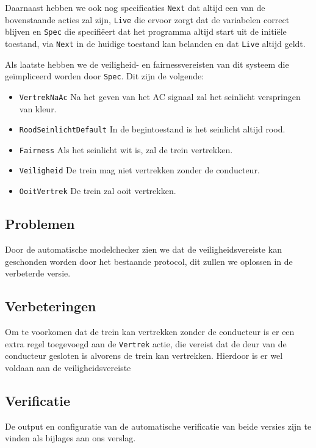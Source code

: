 \documentclass[a4paper,10pt]{article}
\begin{document}
Daarnaast hebben we ook nog specificaties \texttt{Next} dat altijd een van de
bovenstaande acties zal zijn, \texttt{Live} die ervoor zorgt dat de
variabelen correct blijven en \texttt{Spec} die specifi\"eert dat het programma
altijd start uit de initi\"ele toestand, via \texttt{Next} in de huidige toestand
kan belanden en dat \texttt{Live} altijd geldt.

Als laatste hebben we de veiligheid- en fairnessvereisten van dit systeem die
ge\"impliceerd worden door \texttt{Spec}. Dit zijn de volgende:

\begin{itemize}
    \item \texttt{VertrekNaAc} Na het geven van het AC signaal zal het seinlicht
    verspringen van kleur.
    \item \texttt{RoodSeinlichtDefault} In de begintoestand is het seinlicht
    altijd rood.
    \item \texttt{Fairness} Als het seinlicht wit is, zal de trein vertrekken.
    \item \texttt{Veiligheid} De trein mag niet vertrekken zonder de conducteur.
    \item \texttt{OoitVertrek} De trein zal ooit vertrekken.
\end{itemize}

\subsection{Problemen}

Door de automatische modelchecker zien we dat de veiligheidsvereiste kan
geschonden worden door het bestaande protocol, dit zullen we oplossen in de
verbeterde versie.

\subsection{Verbeteringen}

Om te voorkomen dat de trein kan vertrekken zonder de conducteur is er een extra
regel toegevoegd aan de \texttt{Vertrek} actie, die vereist dat de deur van de
conducteur gesloten is alvorens de trein kan vertrekken. Hierdoor is er wel
voldaan aan de veiligheidsvereiste

\subsection{Verificatie}

De output en configuratie van de automatische verificatie van beide versies zijn
te vinden als bijlages aan ons verslag.
\end{document}
